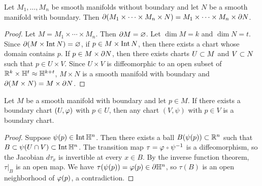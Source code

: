 \documentclass[10pt]{article}
\begin{document}
\begin{proposition}
    Let ${M}_{1},\dots,{M}_{n}$ be smooth manifolds without boundary and let $N$ be a smooth manifold with boundary. Then $\partial({M}_{1}\times\cdots\times{M}_{n}\times N)={M}_{1}\times\cdots\times{M}_{n}\times\partial N$.
\end{proposition}
\begin{proof}
    Let $M={M}_{1}\times\cdots\times{M}_{n}$. Then $\partial M=\varnothing$. Let $\dim M=k$ and $\dim N=t$. Since $\partial(M\times\operatorname{Int} N)=\varnothing$, if $p\in M\times\operatorname{Int} N$, then there exists a chart whose domain contains $p$. If $p\in M\times\partial N$, then there exists charts $U\subset M$ and $V\subset N$ such that $p\in U\times V$. Since $U\times V$ is diffeomorphic to an open subset of ${\mathbb{R}}^{k}\times{\mathbb{H}}^{t}\approx{\mathbb{H}}^{k+t}$, $M\times N$ is a smooth manifold with boundary and $\partial(M\times N)=M\times\partial N$.
\end{proof}
\begin{proposition}
    Let $M$ be a smooth manifold with boundary and let $p\in M$. If there exists a boundary chart $(U,\varphi)$ with $p\in U$, then any chart $(V,\psi)$ with $p\in V$ is a boundary chart.
\end{proposition}
\begin{proof}
    Suppose $\psi(p)\in\operatorname{Int}{\mathbb{H}}^{n}$. Then there exists a ball $B(\psi(p))\subset{\mathbb{R}}^{n}$ such that $B\subset\psi(U\cap V)\subset\operatorname{Int}{\mathbb{H}}^{n}$. The transition map $\tau=\vp\comp{\psi}^{-1}$ is a diffeomorphism, so the Jacobian $d{\tau}_{x}$ is invertible at every $x\in B$. By the inverse function theorem, $\tau{|}_{B}$ is an open map. We have $\tau(\psi(p))=\varphi(p)\in\partial{\mathbb{H}}^{n}$, so $\tau(B)$ is an open neighborhood of $\varphi(p)$, a contradiction. 
\end{proof}
\hindex
{}
\end{document}
